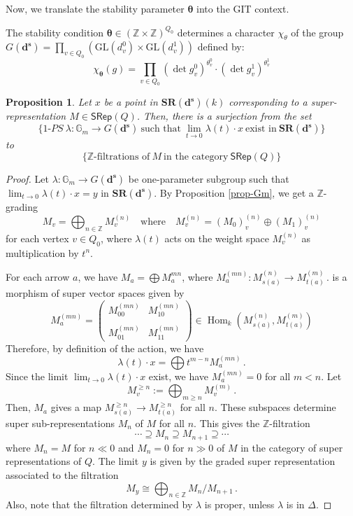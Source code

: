 \documentclass[12pt, reqno]{amsart}
\theoremstyle{plain}
\newtheorem{proposition}[theorem]{Proposition}
\numberwithin{equation}{section}
\def \sd{\mathbf{d^s}}
\def \Z{\mathbb{Z}}
\def \ra{\rightarrow}
\def \bfSR{\mathbf{SR}}
\def \btheta{\boldsymbol{\theta}}
\newcommand{\Hom}{\operatorname{Hom}\nolimits}
\begin{document}
Now, we translate the stability parameter $\btheta$ into the GIT context.

The stability condition $\btheta \in (\mathbb{Z} \times \mathbb{Z})^{Q_0}$ determines a character $\chi_\theta$ of the group $G(\sd) = \prod_{v \in Q_0} (\text{GL}(d_v^0) \times \text{GL}(d_v^1))$ defined by:
\[ \chi_{\btheta}(g) = \prod_{v \in Q_0} (\det g_v^0)^{\theta_v^0} \cdot (\det g_v^1)^{\theta_v^1} \]

\begin{proposition}\label{prop-1-ps-filtration}
Let $x$ be a point in $\bfSR(\sd)(k)$ corresponding to a super-representation $M \in \mathsf{SRep}(Q)$. Then, there is a surjection from the set
$$
\{1\text{-}PS ~\lambda\colon \mathbb{G}_m \ra G(\sd) ~\mbox{such that} ~ \lim_{t \to 0} \lambda(t) \cdot x ~\mbox{exist in} ~ \bfSR(\sd)\}
$$
to
$$
\{\mathbb{Z}\mbox{-filtrations of} ~ M ~\mbox{in the category}~ \mathsf{SRep}(Q)\}
$$
\end{proposition}
\begin{proof}
Let $\lambda \colon \mathbb{G}_m \ra G(\sd)$ be one-parameter subgroup such that $\lim_{t \to 0} \lambda(t) \cdot x = y$ in 
$\bfSR(\sd)$. By Proposition \ref{prop-Gm}, we get a 
$\mathbb{Z}$-grading 
    \[
    M_v = \bigoplus_{n \in \mathbb{Z}} M_v^{(n)} \quad \text{where} \quad M_v^{(n)} = (M_0)_v^{(n)} \oplus (M_1)_v^{(n)}
    \]
for each vertex $v\in Q_0$, where $\lambda(t)$ acts on the weight space $M_v^{(n)}$ as multiplication by $t^n$. 
    
For each arrow $a$, we have $M_a = \bigoplus M_a^{mn}$, where 
$
M_a^{(mn)}\colon M_{s(a)}^{(n)}\ra M_{t(a)}^{(m)}\,.
$
is a morphism of super vector spaces given by
\[
M_a^{(mn)} = \begin{pmatrix}
    M_{00}^{(mn)} & M_{10}^{(mn)} \\
    & \\
    M_{01}^{(mn)} & M_{11}^{(mn)}
\end{pmatrix} \in \Hom_k(M_{s(a)}^{(n)}, M_{t(a)}^{(m)})
\]
Therefore, by definition of the action, we have 
$$
\lambda(t)\cdot x = \bigoplus t^{m-n}M_a^{(mn)}\,.
$$
Since the limit $\lim_{t\rightarrow 0} \lambda(t)\cdot x$ exist, we have 
$M_a^{(mn)} = 0$ for all $m < n$. Let 
$$
M_v^{\geq n} := \bigoplus_{m\geq n} M_v^{(m)}\,.
$$
Then, $M_a$ gives a map $M_{s(a)}^{\geq n}\ra M_{t(a)}^{\geq n}$ for all $n$. 
These subspaces determine super sub-representations $M_n$ of $M$ for all $n$. 
This gives the $\mathbb{Z}$-filtration
$$
\cdots \supseteq M_n \supseteq M_{n+1} \supseteq \cdots
$$
where $M_n = M$ for $n \ll 0$ and $M_n = 0$ for $n \gg 0$ of $M$ in the category of super representations of $Q$. The limit $y$ is given by the graded super representation associated to the filtration
$$
M_y \cong \bigoplus_{n\in \Z} M_n/M_{n+1}\,. 
$$
Also, note that the filtration determined by $\lambda$ is proper, unless $\lambda$ is in $\Delta$.
\end{proof}
\end{document}
